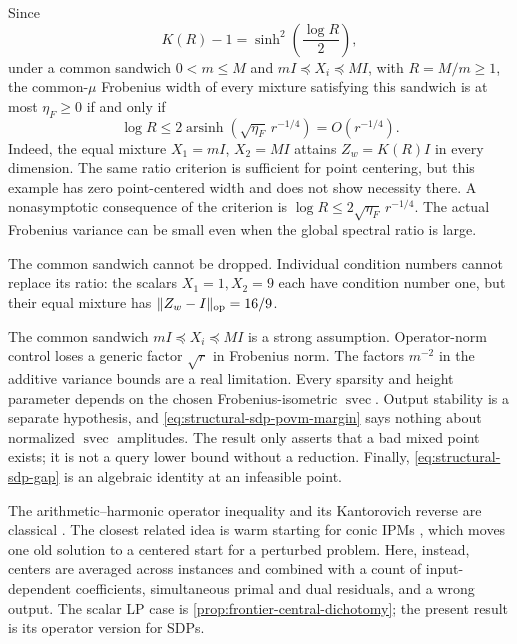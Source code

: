 Since
\begin{equation}
 K(R)-1=\sinh^2\!\left(\frac{\log R}{2}\right),
\end{equation}
under a common sandwich $0<m\leq M$ and $mI\preceq X_i\preceq MI$, with
$R=M/m\geq1$, the common-$\mu$ Frobenius width of every mixture satisfying
this sandwich is at most $\eta_F\geq0$ if and only if
\begin{equation}
 \log R\leq2\operatorname{arsinh}(\sqrt{\eta_F}\,r^{-1/4})
 =O(r^{-1/4}).                                             \label{eq:structural-sdp-high-dim-law}
\end{equation}
Indeed, the equal mixture $X_1=mI$, $X_2=MI$ attains
$Z_w=K(R)I$ in every dimension.  The same ratio criterion is sufficient
for point centering, but this example has zero point-centered width and
does not show necessity there.  A nonasymptotic
consequence of the criterion is $\log R\leq2\sqrt{\eta_F}\,r^{-1/4}$.
The actual Frobenius variance can be small even when the global spectral
ratio is large.

The common sandwich cannot be dropped.  Individual condition numbers cannot
replace its ratio: the scalars $X_1=1,X_2=9$ each have condition number one,
but their equal mixture has $\lVert Z_w-I\rVert_{\rm op}=16/9$.

\begin{remark}
\label{rem:structural-sdp-mixture-scope}
The common sandwich $mI\preceq X_i\preceq MI$ is a strong assumption.
Operator-norm control loses a generic factor $\sqrt r$ in Frobenius norm.
The factors $m^{-2}$ in the additive variance bounds are a real limitation.
Every sparsity and
height parameter depends on the chosen Frobenius-isometric
$\operatorname{svec}$.  Output stability is a separate hypothesis, and
\eqref{eq:structural-sdp-povm-margin} says nothing about normalized
$\operatorname{svec}$ amplitudes.  The result only asserts that a bad mixed
point exists; it is not a query lower bound without a reduction.
Finally, \eqref{eq:structural-sdp-gap} is an algebraic identity at an
infeasible point.

The arithmetic--harmonic operator inequality and its Kantorovich reverse are
classical
\cite{structural-kubo1980-means,structural-ando1983-arithmetic,
structural-marshall1990-kantorovich,lin2013-on-an-operator-kantorovich-inequality}.
The closest related idea is warm starting for conic IPMs
\cite{structural-chen2025-conic-warmstart}, which moves one old solution to a
centered start for a perturbed problem.  Here, instead, centers are averaged
across instances and combined with a count of input-dependent coefficients,
simultaneous primal and dual residuals, and a wrong output.  The scalar LP
case is \cref{prop:frontier-central-dichotomy}; the present result is its
operator version for SDPs.
\end{remark}


